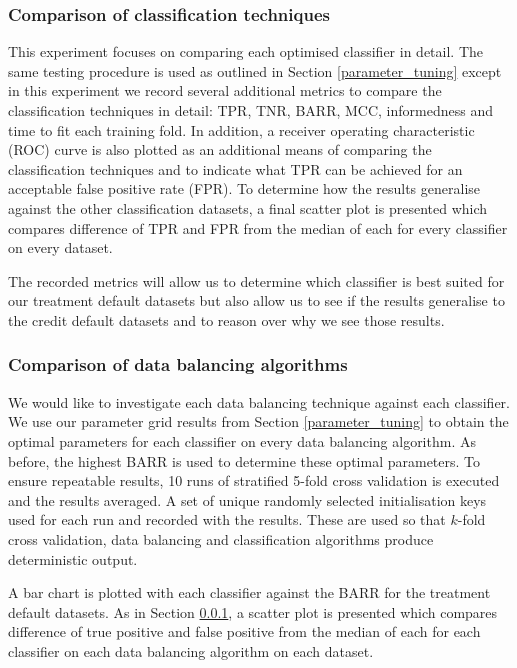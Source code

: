 \documentclass{sig-alternate-05-2015}
\begin{document}
	\subsubsection{Comparison of classification techniques}
	\label{comparision_of_classification_technique}
	This experiment focuses on comparing each optimised classifier in detail. The same testing procedure is used as outlined in Section \ref{parameter_tuning} except in this experiment we record several additional metrics to compare the classification techniques in detail: TPR, TNR, BARR, MCC, informedness and time to fit each training fold. In addition, a receiver operating characteristic (ROC) curve is also plotted as an additional means of comparing the classification techniques and to indicate what TPR can be achieved for an acceptable false positive rate (FPR). To determine how the results generalise against the other classification datasets, a final scatter plot is presented which compares difference of TPR and FPR from the median of each for every classifier on every dataset.
	
	The recorded metrics will allow us to determine which classifier is best suited for our treatment default datasets but also allow us to see if the results generalise to the credit default datasets and to reason over why we see those results.
	
	\subsubsection{Comparison of data balancing algorithms}
	We would like to investigate each data balancing technique against each classifier. We use our parameter grid results from Section \ref{parameter_tuning} to obtain the optimal parameters for each classifier on every data balancing algorithm. As before, the highest BARR is used to determine these optimal parameters. To ensure repeatable results, 10 runs of stratified 5-fold cross validation is executed and the results averaged. A set of unique randomly selected initialisation keys used for each run and recorded with the results. These are used so that $k$-fold cross validation, data balancing and classification algorithms produce deterministic output.
	
	A bar chart is plotted with each classifier against the BARR for the treatment default datasets. As in Section \ref{comparision_of_classification_technique}, a scatter plot is presented which compares difference of true positive and false positive from the median of each for each classifier on each data balancing algorithm on each dataset. 
	
\end{document}
